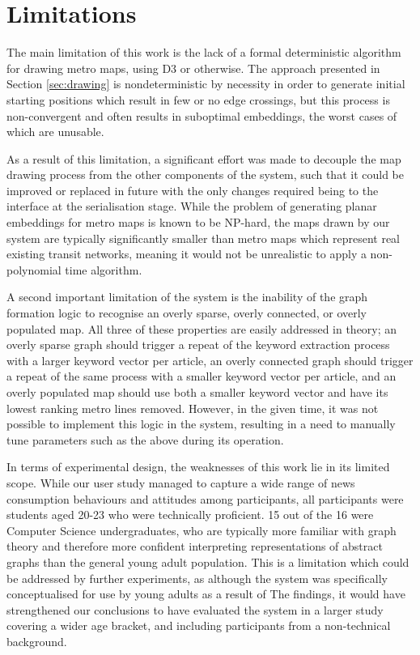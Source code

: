 \section{Limitations}

The main limitation of this work is the lack of a formal deterministic algorithm for drawing metro maps, using D3 or otherwise. The approach presented in Section \ref{sec:drawing} is nondeterministic by necessity in order to generate initial starting positions which result in few or no edge crossings, but this process is non-convergent and often results in suboptimal embeddings, the worst cases of which are unusable. 

As a result of this limitation, a significant effort was made to decouple the map drawing process from the other components of the system, such that it could be improved or replaced in future with the only changes required being to the interface at the serialisation stage. While the problem of generating planar embeddings for metro maps is known to be NP-hard, the maps drawn by our system are typically significantly smaller than metro maps which represent real existing transit networks, meaning it would not be unrealistic to apply a non-polynomial time algorithm.

A second important limitation of the system is the inability of the graph formation logic to recognise an overly sparse, overly connected, or overly populated map. All three of these properties are easily addressed in theory; an overly sparse graph should trigger a repeat of the keyword extraction process with a larger keyword vector per article, an overly connected graph should trigger a repeat of the same process with a smaller keyword vector per article, and an overly populated map should use both a smaller keyword vector and have its lowest ranking metro lines removed. However, in the given time, it was not possible to implement this logic in the system, resulting in a need to manually tune parameters such as the above during its operation.

In terms of experimental design, the weaknesses of this work lie in its limited scope. While our user study managed to capture a wide range of news consumption behaviours and attitudes among participants, all participants were students aged 20-23 who were technically proficient. 15 out of the 16 were Computer Science undergraduates, who are typically more familiar with graph theory and therefore more confident interpreting representations of abstract graphs than the general young adult population. This is a limitation which could be addressed by further experiments, as although the system was specifically conceptualised for use by young adults as a result of The  findings, it would have strengthened our conclusions to have evaluated the system in a larger study covering a wider age bracket, and including participants from a non-technical background.

